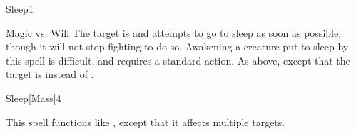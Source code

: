 \begin{spellsection}{Sleep}{1}
    \begin{spellheader}
    \end{spellheader}
    \begin{spellcontent}
        \begin{spelltargetinginfo}
        \end{spelltargetinginfo}
        \begin{spelleffects}
            \begin{spellattack}{Magic vs. Will}
                \spellsuccess The target is \fatigued and attempts to go to sleep as soon as possible, though it will not stop fighting to do so. Awakening a creature put to sleep by this spell is difficult, and requires a standard action.
                \spellcritical As above, except that the target is \exhausted instead of \fatigued.
            \end{spellattack}
            \spelldur \durshort
        \end{spelleffects}
    \end{spellcontent}
    \begin{spellfooter}
        \miscastrandom
    \end{spellfooter}
\end{spellsection}

\begin{spellsection}{Sleep}[Mass]{4}
    \begin{spellheader}
    \end{spellheader}
    \begin{spellcontent}
        \begin{spelltargetinginfo}
        \end{spelltargetinginfo}
        \begin{spelleffects}
            \spellspecial This spell functions like , except that it affects multiple targets.
        \end{spelleffects}
    \end{spellcontent}
    \begin{spellfooter}
        \miscastexplode
    \end{spellfooter}
\end{spellsection}

